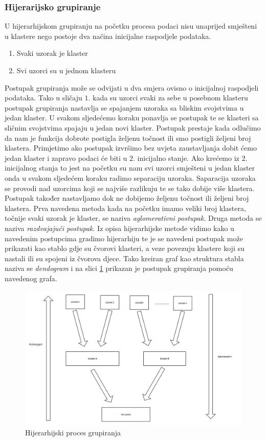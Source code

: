 \documentclass[a4paper,twoside,12pt]{memoir} %
\begin{document}
\subsubsection{Hijerarijsko grupiranje}
U hijerarhijskom grupiranju na početku procesa podaci nisu unaprijed smješteni u klastere nego postoje dva načina inicijalne raspodjele podataka.
\begin{enumerate}
\item Svaki uzorak je klaster
\item Svi uzorci su u jednom klasteru
\end{enumerate}
Postupak grupiranja može se odvijati u dva smjera ovisno o inicijalnoj raspodjeli podataka. Tako u sličaju $1.$ kada su uzorci svaki za sebe u posebnom klasteru postupak grupiranja nastavlja se spajanjem uzoraka sa bliskim svojstvima u jedan klaster. U svakom sljedećemo koraku ponavlja se postupak te se klasteri sa sličnim svojstvima spajaju u jedan novi klaster. Postupak prestaje kada odlučimo da nam je funkcija dobrote postigla željenu točnost ili smo postigli željeni broj klastera. Primjetimo ako postupak izvršimo bez uvjeta zaustavljanja dobit ćemo jedan klaster i zapravo podaci će biti u $2.$ inicijalno stanje. Ako krećemo iz $2.$ inicijalnog stanja to jest na početku su nam svi uzorci smješteni u jedan klaster onda u svakom sljedećem koraku radimo separaciju uzoraka. Saparacija uzoraka se provodi nad uzorcima koji se najviše razlikuju te se tako dobije više klastera. Postupak također nastavljamo dok ne dobijemo željenu točnost ili željeni broj klastera. Prva navedena metoda kada na početku imamo veliki broj klastera, točnije svaki uzorak je klaster, se naziva \textit{aglomerativni postupak}. Druga metoda se naziva \textit{razdvajajući postupak}. Iz opisa hijerarhijske metode vidimo kako u navedenim postupcima gradimo hijerarhiju te je se navedeni postupak može prikazati kao stablo gdje su čvorovi klasteri, a veze povezuju klastere koji su nastali ili su spojeni iz čvorova djece. Tako kreiran graf kao struktura stabla naziva se \textit{dendogram} i na slici \ref{fig:hijer_klas} prikazan je postupak grupiranja pomoću navedenog grafa.
\newpage
\begin{figure}[h!t]
\centering \includegraphics[scale=0.4]{hijerahije_klasteri.jpg}
\caption{Hijerarhijski proces grupiranja}
\label{fig:hijer_klas}
\end{figure}
\end{document}
